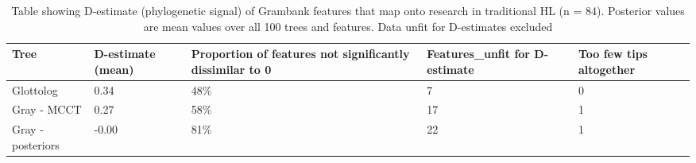 \begin{table}[ht]
\centering
\begin{tabular}{p{3cm}p{2.2cm}p{4cm}p{3cm}p{2cm}}
  \hline
Tree & D-estimate (mean) & Proportion of features not significantly dissimilar to 0 & Features\_unfit for D-estimate & Too few tips altogether \\ 
  \hline
Glottolog & 0.34 & 48\% & 7 & 0 \\ 
  Gray - MCCT & 0.27 & 58\% & 17 & 1 \\ 
  Gray - posteriors & -0.00 & 81\% & 22 & 1 \\ 
   \hline
\end{tabular}
\caption{Table showing D-estimate (phylogenetic signal) of Grambank features that map onto research in traditional HL (n = 84). Posterior values are mean values over all 100 trees and features. Data unfit for D-estimates excluded} 
\label{d_estimate_summary}
\end{table}

